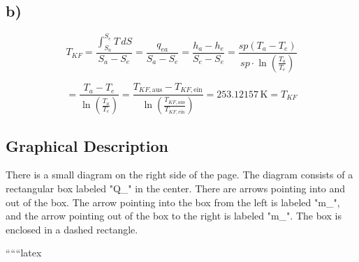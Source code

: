 

\subsection*{b)}

\[
T_{KF} = \frac{\int_{S_a}^{S_e} T \, dS}{S_a - S_e} = \frac{q_{ea}}{S_a - S_e} = \frac{h_a - h_e}{S_e - S_e} = \frac{sp (T_a - T_e)}{sp \cdot \ln \left( \frac{T_a}{T_e} \right)}
\]

\[
= \frac{T_a - T_e}{\ln \left( \frac{T_a}{T_e} \right)} = \frac{T_{KF, \text{aus}} - T_{KF, \text{ein}}}{\ln \left( \frac{T_{KF, \text{aus}}}{T_{KF, \text{ein}}} \right)} = 253.12157 \, \text{K} = T_{KF}
\]

\subsection*{Graphical Description}

There is a small diagram on the right side of the page. The diagram consists of a rectangular box labeled "Q_{}" in the center. There are arrows pointing into and out of the box. The arrow pointing into the box from the left is labeled "m_{}", and the arrow pointing out of the box to the right is labeled "m_{}". The box is enclosed in a dashed rectangle.

``````latex